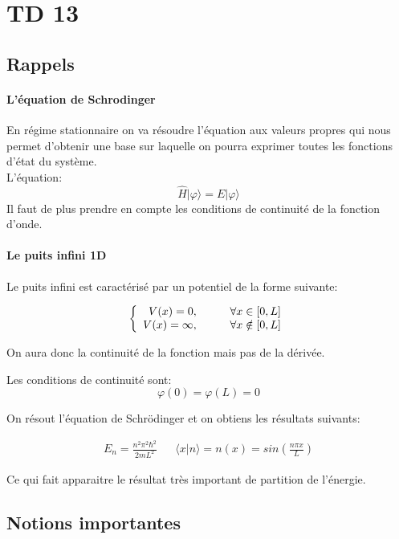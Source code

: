 \section{TD 13}


\subsection{Rappels}


\paragraph{L'équation de Schrodinger}

En régime stationnaire on va résoudre l'équation aux valeurs propres qui nous permet d'obtenir une base sur laquelle on pourra exprimer toutes les fonctions d'état du système.\\
L'équation:
\[
	\hat{H}| \varphi \rangle=E| \varphi \rangle
\]
Il faut de plus prendre en compte les conditions de continuité de la fonction d'onde.

\paragraph{Le puits infini 1D}

Le puits infini est caractérisé par un potentiel de la forme suivante:

\[
	\left\{
	\begin{array}{r c l}
		V(x)=0, & & \quad \forall x \in [0,L] \\
		V(x)=\infty, & & \quad \forall x \notin [0,L]
	\end{array}
	\right.
\]

On aura donc la continuité de la fonction mais pas de la dérivée.


Les conditions de continuité sont:
\[
	\varphi (0)=\varphi (L)=0
\]

On résout l'équation de Schrödinger et on obtiens les résultats suivants:

\begin{align*}
	E_n=\frac{n^2 \pi^2 \hbar^2}{2mL^2} && \langle x|n\rangle= n(x)=sin\left(\frac{n\pi x}{L}\right)
\end{align*}

Ce qui fait apparaitre le résultat très important de partition de l'énergie.


\subsection{Notions importantes}


